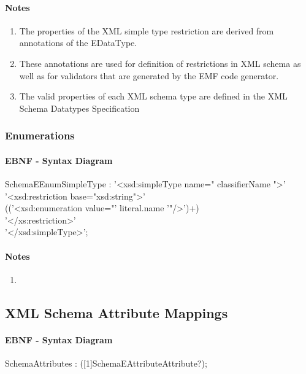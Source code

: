 \documentclass[11pt,a4paper]{article}
\begin{document}
\paragraph{Notes}
\begin{enumerate}
\item The properties of the XML simple type restriction are derived from annotations of the EDataType.
\item These annotations are used for definition of restrictions in XML schema as well as for validators that are generated by the EMF code generator. 
\item The valid properties of each XML schema type are defined in the XML Schema Datatypes Specification\cite{w3c:schemapart2}
\end{enumerate}

\subsubsection{Enumerations}
\paragraph{EBNF - Syntax Diagram}
\begin{rail}
SchemaEEnumSimpleType : 
'<xsd:simpleType name=" classifierName ">'\\
  '<xsd:restriction base="xsd:string">' \\
        (('<xsd:enumeration value="' literal.name '"/>')+) \\
     '</xs:restriction>' \\
  '</xsd:simpleType>';
\end{rail}

\paragraph{Notes}
\begin{enumerate}
\item
\end{enumerate}


\subsection{XML Schema Attribute Mappings}
\paragraph{EBNF - Syntax Diagram}
\begin{rail}
SchemaAttributes :
([1]SchemaEAttributeAttribute?);
\end{rail}
\end{document}
